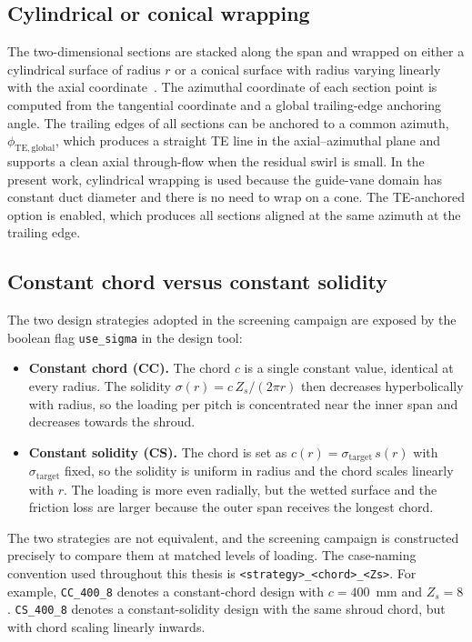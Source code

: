 \subsection{Cylindrical or conical wrapping}
\label{sec:theory_wrapping}
 
The two-dimensional sections are stacked along the span and wrapped on either a cylindrical surface of radius $r$ or a conical surface with radius varying linearly with the axial coordinate~\cite{Leonsen2025}. The azimuthal coordinate of each section point is computed from the tangential coordinate and a global trailing-edge anchoring angle. The trailing edges of all sections can be anchored to a common azimuth, $\phi_{\mathrm{TE,global}}$, which produces a straight TE line in the axial--azimuthal plane and supports a clean axial through-flow when the residual swirl is small. In the present work, cylindrical wrapping is used because the guide-vane domain has constant duct diameter and there is no need to wrap on a cone. The TE-anchored option is enabled, which produces all sections aligned at the same azimuth at the trailing edge.
 
\subsection{Constant chord versus constant solidity}
\label{sec:theory_const_chord_const_sol}
 
The two design strategies adopted in the screening campaign are exposed by the boolean flag \texttt{use\_sigma} in the design tool:
\begin{itemize}
  \item \textbf{Constant chord (CC).} The chord $c$ is a single constant value, identical at every radius. The solidity $\sigma(r) = c\,Z_s/(2\pi r)$ then decreases hyperbolically with radius, so the loading per pitch is concentrated near the inner span and decreases towards the shroud.
  \item \textbf{Constant solidity (CS).} The chord is set as $c(r) = \sigma_{\mathrm{target}}\,s(r)$ with $\sigma_{\mathrm{target}}$ fixed, so the solidity is uniform in radius and the chord scales linearly with $r$. The loading is more even radially, but the wetted surface and the friction loss are larger because the outer span receives the longest chord.
\end{itemize}
The two strategies are not equivalent, and the screening campaign is constructed precisely to compare them at matched levels of loading. The case-naming convention used throughout this thesis is \texttt{<strategy>\_<chord>\_<Zs>}. For example, \texttt{CC\_400\_8} denotes a constant-chord design with $c = 400$~mm and $Z_s = 8$. \texttt{CS\_400\_8} denotes a constant-solidity design with the same shroud chord, but with chord scaling linearly inwards.


